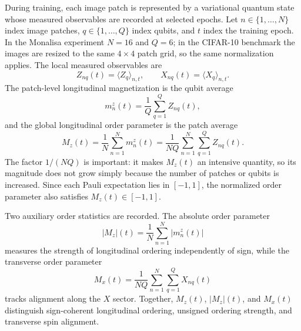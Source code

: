\documentclass[11pt]{article}
\begin{document}
During training, each image patch is represented by a variational quantum state whose measured observables are recorded at selected epochs. Let $n\in\{1,\ldots,N\}$ index image patches, $q\in\{1,\ldots,Q\}$ index qubits, and $t$ index the training epoch. In the Monalisa experiment $N=16$ and $Q=6$; in the CIFAR-10 benchmark the images are resized to the same $4\times4$ patch grid, so the same normalization applies. The local measured observables are
\begin{equation}
Z_{nq}(t)=\langle Z_q\rangle_{n,t},
\qquad
X_{nq}(t)=\langle X_q\rangle_{n,t}.
\end{equation}
The patch-level longitudinal magnetization is the qubit average
\begin{equation}
m_n^{z}(t)
=
\frac{1}{Q}
\sum_{q=1}^{Q} Z_{nq}(t),
\end{equation}
and the global longitudinal order parameter is the patch average
\begin{equation}
M_z(t)
=
\frac{1}{N}
\sum_{n=1}^{N}m_n^{z}(t)
=
\frac{1}{NQ}
\sum_{n=1}^{N}
\sum_{q=1}^{Q}Z_{nq}(t).
\label{eq:global_order}
\end{equation}
The factor $1/(NQ)$ is important: it makes $M_z(t)$ an intensive quantity, so its magnitude does not grow simply because the number of patches or qubits is increased. Since each Pauli expectation lies in $[-1,1]$, the normalized order parameter also satisfies $M_z(t)\in[-1,1]$.

Two auxiliary order statistics are recorded. The absolute order parameter
\begin{equation}
|M_z|(t)
=
\frac{1}{N}
\sum_{n=1}^{N}\left|m_n^{z}(t)\right|
\end{equation}
measures the strength of longitudinal ordering independently of sign, while the transverse order parameter
\begin{equation}
M_x(t)
=
\frac{1}{NQ}
\sum_{n=1}^{N}
\sum_{q=1}^{Q}X_{nq}(t)
\end{equation}
tracks alignment along the $X$ sector. Together, $M_z(t)$, $|M_z|(t)$, and $M_x(t)$ distinguish sign-coherent longitudinal ordering, unsigned ordering strength, and transverse spin alignment.
\end{document}
